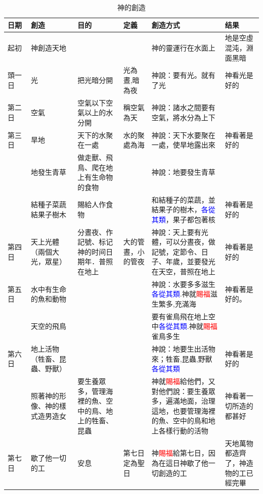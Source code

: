 \begin{table}[!hbp]
\centering
\begin{tabular}{p{1.1cm}|p{}| p{2.2cm}|p{2.2cm}|p{3cm}|p{3cm}}
\hline
\hline
日期 & 創造 & 目的& 定義  & 創造方式&  结果 \\\hline
起初  & 神創造天地&& &神的靈運行在水面上&  地是空虛混沌，淵面黑暗 \\\hline
頭一日 & 光 & 把光暗分開& 光為晝,暗為夜&神說：要有光。就有了光&  神看光是好的  \\\hline
第二日&空氣 & 空氣以下空氣以上的水分開&  稱空氣為天& 神說：諸水之間要有空氣，將水分為上下& \\\hline
第三日&旱地 &天下的水聚在一處   &水的聚處為海 &神說：天下水要聚在一處，使旱地露出來& 神看著是好的\\
          &地發生青草&做走獸、飛鳥、爬在地上有生命物的食物　&　 &神說：地要發生青草&\\
          &結種子菜蔬結果子樹木　　　&賜給人作食物　&&和結種子的菜蔬，並結果子的樹木，\textcolor{blue}{各從其類}，果子都包著核&神看著是好的\\\hline
第四日&天上光體（兩個大光，眾星） &分晝夜、作記號、标记神的时间日期年．普照在地上&大的管晝，小的管夜&神說：天上要有光體，可以分晝夜，做記號，定節令、日子、年歲，並要發光在天空，普照在地上&神看著是好的\\\hline
第五日&水中有生命的魚和動物 && &神說：水要多多滋生\textcolor{blue}{各從其類}.神就\textcolor{red}{賜福}滋生繁多,充滿海 &神看著是好的。 \\
          & 天空的飛鳥 &  && 要有雀鳥飛在地上空中\textcolor{blue}{各從其類}.神就\textcolor{red}{賜福}  雀鳥多生&\\\hline
第六日& 地上活物（牲畜、昆蟲、野獸）& &&神說：地要生出活物來；牲畜,昆蟲,野獸\textcolor{blue}{各從其類}&神看著是好的\\
&照著神的形像、神的樣式造男造女 &要生養眾多，管理海裡的魚、空中的鳥、地上的牲畜、昆蟲 &&神就\textcolor{red}{賜福}給他們，又對他們說：要生養眾多，遍滿地面，治理這地，也要管理海裡的魚、空中的鳥和地上各樣行動的活物&神看著一切所造的都甚好\\\hline
第七日　&歇了他一切的工&安息&第七日定為聖日&神\textcolor{red}{賜福}給第七日，因為在這日神歇了他一切創造的工&天地萬物都造齊了，神造物的工已經完畢\\
\hline
\end{tabular}
\caption{神的創造}
\end{table}

